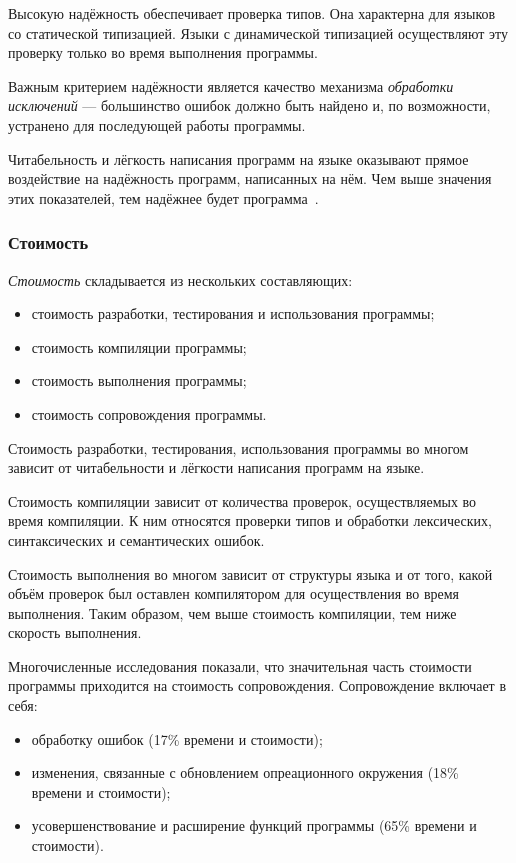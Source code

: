            Высокую надёжность обеспечивает проверка типов.
            Она характерна для языков со статической типизацией.
            Языки с динамической типизацией осуществляют эту проверку только во время выполнения программы.

            Важным критерием надёжности является качество механизма \textit{обработки исключений} --- большинство ошибок должно быть найдено и, по возможности, устранено для последующей работы программы.

            Читабельность и лёгкость написания программ на языке оказывают прямое воздействие на надёжность программ, написанных на нём.
            Чем выше значения этих показателей, тем надёжнее будет программа~\cite{langs}.
        \subsubsection{Стоимость}
            \textit{Стоимость} складывается из нескольких составляющих:
            \begin{itemize}
                \item стоимость разработки, тестирования и использования программы;
                \item стоимость компиляции программы;
                \item стоимость выполнения программы;
                \item стоимость сопровождения программы.
            \end{itemize}

            Стоимость разработки, тестирования, использования программы во многом зависит от читабельности и лёгкости написания программ на языке.

            Стоимость компиляции зависит от количества проверок, осуществляемых во время компиляции.
            К ним относятся проверки типов и обработки лексических, синтаксических и семантических ошибок.

            Стоимость выполнения во многом зависит от структуры языка и от того, какой объём проверок был оставлен компилятором для осуществления во время выполнения.
            Таким образом, чем выше стоимость компиляции, тем ниже скорость выполнения.

            Многочисленные исследования показали, что значительная часть стоимости программы приходится на стоимость сопровождения.
            Сопровождение включает в себя:
            \begin{itemize}
                \item обработку ошибок (17\% времени и стоимости);
                \item изменения, связанные с обновлением опреационного окружения (18\% времени и стоимости);
                \item усовершенствование и расширение функций программы (65\% времени и стоимости).
            \end{itemize}

